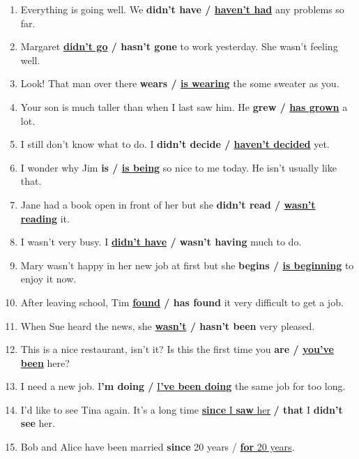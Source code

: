 \documentclass[main.tex]{subfiles}
\begin{document}
\begin{enumerate}[nosep,leftmargin=*]
	\itemsep\eitsp
	\setcounter{enumi}{5}
	\item Everything is going well. We \textbf{didn't have / \underline{haven't had}} any problems so far.
	\item Margaret \textbf{\underline{didn't go} / hasn't gone} to work yesterday. She wasn't feeling well.
	\item Look! That man over there \textbf{wears / \underline{is wearing}} the some sweater as you.
	\item Your son is much taller than when I last saw him. He \textbf{grew / \underline{has grown}} a lot.
	\item I still don't know what to do. I \textbf{didn't decide / \underline{haven't decided}} yet.
	\item I wonder why Jim \textbf{is / \underline{is being}} so nice to me today. He isn't usually like that.
	\item Jane had a book open in front of her but she \textbf{didn't read / \underline{wasn't reading}} it.
	\item I wasn't very busy. I \textbf{\underline{didn't have} / wasn't having} much to do.
	\item Mary wasn't happy in her new job at first but she \textbf{begins / \underline{is beginning}} to enjoy it now.
	\item After leaving school, Tim \textbf{\underline{found} / has found} it very difficult to get a job.
	\item When Sue heard the news, she \textbf{\underline{wasn't} / hasn't been} very pleased.
	\item This is a nice restaurant, isn't it? Is this the first time you \textbf{are / \underline{you've been}} here?
	\item I need a new job. I\textbf{'m doing /} \underline{I\textbf{'ve been doing}} the same job for too long.
	\item I'd like to see Tina again. It's a long time \underline{\textbf{since} I \textbf{saw} her} \textbf{/ that} I \textbf{didn't see} her.
	\item Bob and Alice have been married \textbf{since} 20 years / \underline{\textbf{for} 20 years}.
\end{enumerate}
\end{document}
